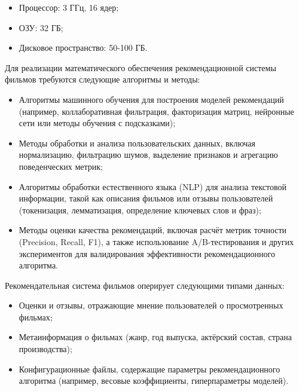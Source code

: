 \begin{itemize}
	\item Процессор: 3 ГГц, 16 ядер;
	\item ОЗУ: 32 ГБ;
	\item Дисковое пространство: 50-100 ГБ.
\end{itemize}





Для реализации математического обеспечения рекомендационной системы фильмов
требуются следующие алгоритмы и методы:

\begin{itemize}
	\item Алгоритмы машинного обучения для построения моделей рекомендаций
	(например, коллаборативная фильтрация, факторизация матриц,
	нейронные сети или методы обучения с подсказками);
	\item Методы обработки и анализа пользовательских данных, включая нормализацию,
	фильтрацию шумов, выделение признаков и агрегацию поведенческих метрик;
	\item Алгоритмы обработки естественного языка (NLP) для анализа текстовой информации,
	такой как описания фильмов или отзывы пользователей
	(токенизация, лемматизация, определение ключевых слов и фраз);
	\item Методы оценки качества рекомендаций, включая расчёт метрик точности (Precision, Recall, F1),
	а также использование A/B-тестирования и других экспериментов
	для валидирования эффективности рекомендационного алгоритма.
\end{itemize}



Рекомендательная система фильмов оперирует следующими типами данных:
\begin{itemize}
	\item Оценки и отзывы, отражающие мнение пользователей о просмотренных фильмах;
	\item Метаинформация о фильмах (жанр, год выпуска, актёрский состав, страна производства);
	\item Конфигурационные файлы, содержащие параметры рекомендационного алгоритма (например, весовые коэффициенты, гиперпараметры моделей).
\end{itemize}

